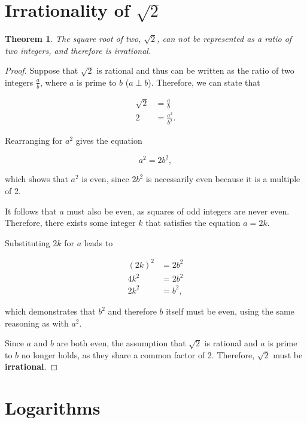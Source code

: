 \documentclass[parskip]{scrartcl}
\newtheorem{theorem}{Theorem}
\begin{document}
\section{Irrationality of \(\sqrt{2}\)}

\begin{theorem}
  The square root of two, \(\sqrt{2}\), can not be represented as a ratio of two
  integers, and therefore is irrational.
\end{theorem}

\begin{proof}
  Suppose that \(\sqrt{2}\) is rational and thus can be written as the ratio of
  two integers \(\frac{a}{b}\), where \(a\) is prime to \(b\) (\(a ⟂ b\)).
  Therefore, we can state that

  \begin{align*}
    \sqrt{2} &= \frac{a}{b} \\
    2 &= \frac{a^2}{b^2}.
  \end{align*}

  Rearranging for \(a^2\) gives the equation

  \begin{equation*}
    a^2 = 2b^2,
  \end{equation*}

  which shows that \(a^2\) is even, since \(2b^2\) is necessarily even because
  it is a multiple of 2.

  It follows that \(a\) must also be even, as squares of odd integers are never
  even. Therefore, there exists some integer \(k\) that satisfies the equation
  \(a = 2k\).

  Substituting \(2k\) for \(a\) leads to

  \begin{align*}
    {(2k)}^2 &= 2b^2 \\
    4k^2 &= 2b^2 \\
    2k^2 &= b^2,
  \end{align*}

  which demonstrates that \(b^2\) and therefore \(b\) itself must be even, using
  the same reasoning as with \(a^2\).

  Since \(a\) and \(b\) are both even, the assumption that \(\sqrt{2}\) is
  rational and \(a\) is prime to \(b\) no longer holds, as they share a common
  factor of 2. Therefore, \(\sqrt{2}\) must be \textbf{irrational}.
\end{proof}

\section{Logarithms}
\end{document}
